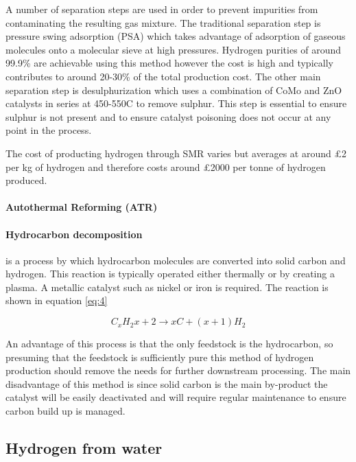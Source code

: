 A number of separation steps are used in order to prevent impurities from contaminating the 
resulting gas mixture. The traditional separation step is pressure swing adsorption (PSA) which takes 
advantage of adsorption of gaseous molecules onto a molecular sieve at high pressures. Hydrogen purities of around 99.9\% are achievable using this method however the cost is high and typically contributes to around 
20-30\% of the total production cost. \cite{Muradov2015} The other main separation step is desulphurization which uses a 
combination of CoMo and ZnO catalysts in series at 450-550\textdegree C to remove sulphur. \cite{Muradov2015}
This step is essential to ensure sulphur is not present and to ensure catalyst 
poisoning does not occur at any point in the process. 

The cost of producting hydrogen through SMR varies but averages at around £2 per kg of hydrogen and therefore costs around £2000 per tonne of hydrogen produced. \cite{hydrogencouncil_2020}

\paragraph{Autothermal Reforming (ATR)}

\paragraph{Hydrocarbon decomposition} is a process by which hydrocarbon molecules are converted into solid carbon and hydrogen. \cite{Ahmed2009} This reaction is typically operated either thermally or by creating a plasma. A metallic catalyst such as nickel or iron is required. The reaction is shown in equation \ref{eq:4} \cite{Muradov2008} 

\begin{equation}\label{eq:4}
    C_x H_2x+2 \rightarrow xC + (x+1)H_2
\end{equation}

An advantage of this process is that the only feedstock is the hydrocarbon, so presuming that the feedstock is sufficiently pure this method of hydrogen production should remove the needs for further downstream processing. \cite{Ahmed2009} The main disadvantage of this method is since solid carbon is the main by-product the catalyst will be easily deactivated and will require regular maintenance to ensure carbon build up is managed. \cite{Ahmed2009}

\subsection{Hydrogen from water}

